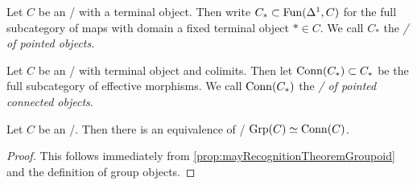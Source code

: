 \begin{definition}
    Let $C$ be an \inftycat/ with a terminal object.
    Then write $C_*\subset\operatorname{Fun}(\Delta^1,C)$ for the full subcategory of maps with domain a fixed terminal object $*\in C$.
    We call $C_*$ the \emph{\inftycat/ of pointed objects}.
\end{definition}
\begin{definition}
    Let $C$ be an \inftycat/ with terminal object and colimits. 
    Then let $\operatorname{Conn}(C_*)\subset C_*$ be the full subcategory of effective morphisms.
    We call $\operatorname{Conn}(C_*)$ the \emph{\inftycat/ of pointed connected objects}.
\end{definition}
\begin{corollary}\label{prop:mayRecognitionTheoremGroup}
    Let $C$ be an \inftytop/. 
    Then there is an equivalence of \inftycats/ $\operatorname{Grp}(C)\simeq\operatorname{Conn}(C)$.
    \begin{proof}
        This follows immediately from \cref{prop:mayRecognitionTheoremGroupoid} and the definition of group objects.
    \end{proof}
\end{corollary}
